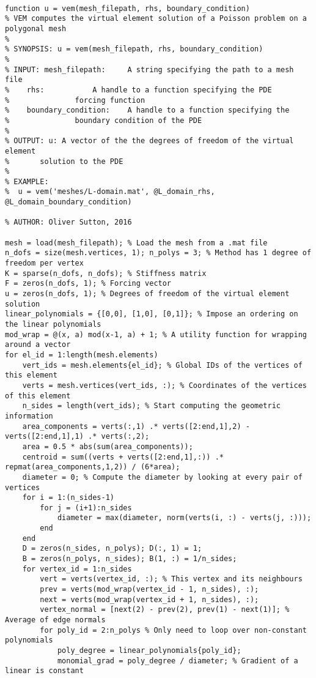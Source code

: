 \documentclass{article}
\begin{document}
\begin{verbatim}

function u = vem(mesh_filepath, rhs, boundary_condition)
% VEM computes the virtual element solution of a Poisson problem on a polygonal mesh
%
% SYNOPSIS: u = vem(mesh_filepath, rhs, boundary_condition)
%
% INPUT: mesh_filepath:		A string specifying the path to a mesh file
%	 rhs:			A handle to a function specifying the PDE 
% 				forcing function
%	 boundary_condition:	A handle to a function specifying the 
% 				boundary condition of the PDE
% 
% OUTPUT: u: A vector of the the degrees of freedom of the virtual element 
%		solution to the PDE
% 
% EXAMPLE:
%  u = vem('meshes/L-domain.mat', @L_domain_rhs, @L_domain_boundary_condition)

% AUTHOR: Oliver Sutton, 2016

mesh = load(mesh_filepath); % Load the mesh from a .mat file
n_dofs = size(mesh.vertices, 1); n_polys = 3; % Method has 1 degree of freedom per vertex
K = sparse(n_dofs, n_dofs); % Stiffness matrix
F = zeros(n_dofs, 1); % Forcing vector
u = zeros(n_dofs, 1); % Degrees of freedom of the virtual element solution
linear_polynomials = {[0,0], [1,0], [0,1]}; % Impose an ordering on the linear polynomials
mod_wrap = @(x, a) mod(x-1, a) + 1; % A utility function for wrapping around a vector
for el_id = 1:length(mesh.elements)
	vert_ids = mesh.elements{el_id}; % Global IDs of the vertices of this element
	verts = mesh.vertices(vert_ids, :); % Coordinates of the vertices of this element
	n_sides = length(vert_ids); % Start computing the geometric information
	area_components = verts(:,1) .* verts([2:end,1],2) - verts([2:end,1],1) .* verts(:,2);
	area = 0.5 * abs(sum(area_components));
	centroid = sum((verts + verts([2:end,1],:)) .* repmat(area_components,1,2)) / (6*area);
	diameter = 0; % Compute the diameter by looking at every pair of vertices
	for i = 1:(n_sides-1)
		for j = (i+1):n_sides
			diameter = max(diameter, norm(verts(i, :) - verts(j, :)));
		end
	end
	D = zeros(n_sides, n_polys); D(:, 1) = 1;
	B = zeros(n_polys, n_sides); B(1, :) = 1/n_sides;
	for vertex_id = 1:n_sides
		vert = verts(vertex_id, :); % This vertex and its neighbours
		prev = verts(mod_wrap(vertex_id - 1, n_sides), :);
		next = verts(mod_wrap(vertex_id + 1, n_sides), :);
		vertex_normal = [next(2) - prev(2), prev(1) - next(1)]; % Average of edge normals
		for poly_id = 2:n_polys % Only need to loop over non-constant polynomials
			poly_degree = linear_polynomials{poly_id};
			monomial_grad = poly_degree / diameter; % Gradient of a linear is constant

\end{verbatim}
\end{document}
